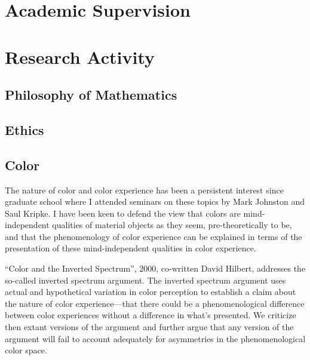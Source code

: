 \documentclass[contbibnum]{cv}
\begin{document}
\section{Academic Supervision}\label{sec:academic_supervision} %




\section{Research Activity}\label{sec:research_activity} %

\subsection{Philosophy of Mathematics}\label{sub:philosophy_of_mathematics} %




\subsection{Ethics}\label{sub:ethics} %




\subsection{Color}\label{sub:color} %

The nature of color and color experience has been a persistent interest since graduate school where I attended seminars on these topics by Mark Johnston and Saul Kripke. I have been keen to defend the view that colors are mind-independent qualities of material objects as they seem, pre-theoretically to be, and that the phenomenology of color experience can be explained in terms of the presentation of these mind-independent qualities in color experience. 

``Color and the Inverted Spectrum'', 2000, co-written David Hilbert, addresses the so-called inverted spectrum argument. The inverted spectrum argument uses actual and hypothetical variation in color perception to establish a claim about the nature of color experience---that there could be a phenomenological difference between color experiences without a difference in what's presented. We criticize then extant versions of the argument and further argue that any version of the argument will fail to account adequately for asymmetries in the phenomenological color space.
\end{document}

